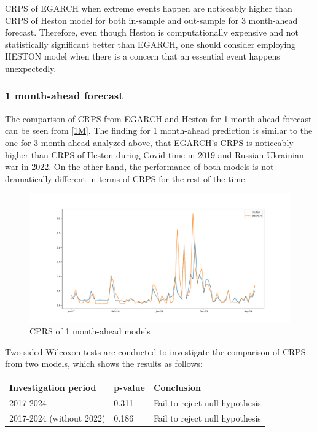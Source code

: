 \documentclass[12pt,a4paper]{article}
\newcommand\colorAutoref[1]{{\hypersetup{linkcolor=black}\autoref{#1}}}
\numberwithin{equation}{section}
\begin{document}
CRPS of EGARCH when extreme events happen are noticeably higher than CRPS of Heston model for both in-sample and out-sample for 3 month-ahead forecast. Therefore, even though Heston is computationally expensive and not statistically significant better than EGARCH, one should consider employing HESTON model when there is a concern that an essential event happens unexpectedly. 


\subsubsection{1 month-ahead forecast}

The comparison of CRPS from EGARCH and Heston for 1 month-ahead forecast can be seen from \colorAutoref{1M}. The finding for 1 month-ahead prediction is similar to the one for 3 month-ahead analyzed above, that EGARCH's CRPS is noticeably higher than CRPS of Heston during Covid time in 2019 and Russian-Ukrainian war in 2022. On the other hand, the performance of both models is not dramatically different in terms of CRPS for the rest of the time.

\begin{figure}[h!] 
\includegraphics[scale=1,width=1\linewidth,height=0.4\textheight]{onemonthahead.png}
\caption{CPRS of 1 month-ahead models}
\label{1M}
\end{figure}

Two-sided Wilcoxon tests are conducted to investigate the comparison of CRPS from two models, which shows the results as follows:

\begin{table}[h!]
\centering
\begin{tabular}{@{}lll@{}}
\toprule
Investigation period     & p-value & Conclusion                     \\ \midrule
2017-2024                & 0.311    & Fail to reject null hypothesis \\
2017-2024 (without 2022) & 0.186    & Fail to reject null hypothesis \\ \bottomrule
\end{tabular}
\end{table}
\end{document}
